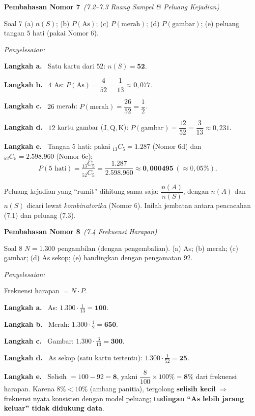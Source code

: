 \documentclass[11pt,a4paper]{article}
\newcommand{\jawab}{\par\smallskip\noindent\textit{\textcolor{oranye}{Penyelesaian:}}\par\smallskip}
\newcommand{\langkah}[1]{\par\smallskip\noindent\textbf{\textcolor{biru}{Langkah #1.}}\ }
\newcommand{\nomorjudul}[2]{\par\bigskip\noindent%
  {\large\bfseries\color{ungu}Pembahasan Nomor #1}\ {\normalfont\itshape\color{gray}(#2)}\par\nopagebreak\smallskip}
\begin{document}
\nomorjudul{7}{7.2--7.3 Ruang Sampel \& Peluang Kejadian}
\begin{soalbox}{Soal 7}
(a) $n(S)$; (b) $P(\mathrm{As})$; (c) $P(\text{merah})$; (d) $P(\text{gambar})$;
(e) peluang tangan $5$ hati (pakai Nomor 6).
\end{soalbox}

\jawab
\langkah{a} Satu kartu dari $52$: $n(S)=\mathbf{52}$.

\langkah{b} $4$ As: $P(\mathrm{As})=\dfrac{4}{52}=\dfrac{1}{13}\approx0{,}077$.

\langkah{c} $26$ merah: $P(\text{merah})=\dfrac{26}{52}=\dfrac{1}{2}$.

\langkah{d} $12$ kartu gambar ($\mathrm{J,Q,K}$):
$P(\text{gambar})=\dfrac{12}{52}=\dfrac{3}{13}\approx0{,}231$.

\langkah{e} Tangan $5$ hati: pakai $_{13}C_5=1.287$ (Nomor 6d) dan
$_{52}C_5=2.598.960$ (Nomor 6c):
\[
P(\text{5 hati})=\frac{{}_{13}C_5}{{}_{52}C_5}=\frac{1.287}{2.598.960}
\approx\mathbf{0{,}000495}\ (\approx0{,}05\%).
\]

\begin{tips}
Peluang kejadian yang ``rumit'' dihitung sama saja: $\dfrac{n(A)}{n(S)}$, dengan
$n(A)$ dan $n(S)$ dicari lewat \emph{kombinatorika} (Nomor 6). Inilah jembatan
antara pencacahan (7.1) dan peluang (7.3).
\end{tips}

\nomorjudul{8}{7.4 Frekuensi Harapan}
\begin{soalbox}{Soal 8}
$N=1.300$ pengambilan (dengan pengembalian). (a) As; (b) merah; (c) gambar;
(d) As sekop; (e) bandingkan dengan pengamatan $92$.
\end{soalbox}

\jawab
Frekuensi harapan $=N\cdot P$.

\langkah{a} As: $1.300\cdot\tfrac{1}{13}=\mathbf{100}$.

\langkah{b} Merah: $1.300\cdot\tfrac12=\mathbf{650}$.

\langkah{c} Gambar: $1.300\cdot\tfrac{3}{13}=\mathbf{300}$.

\langkah{d} As sekop (satu kartu tertentu): $1.300\cdot\tfrac{1}{52}=\mathbf{25}$.

\langkah{e} Selisih $=100-92=\mathbf{8}$, yakni $\dfrac{8}{100}\times100\%=\mathbf{8\%}$
dari frekuensi harapan. Karena $8\%<10\%$ (ambang panitia), tergolong
\textbf{selisih kecil} $\Rightarrow$ frekuensi nyata konsisten dengan model peluang;
\textbf{tudingan ``As lebih jarang keluar'' tidak didukung data}.
\end{document}
